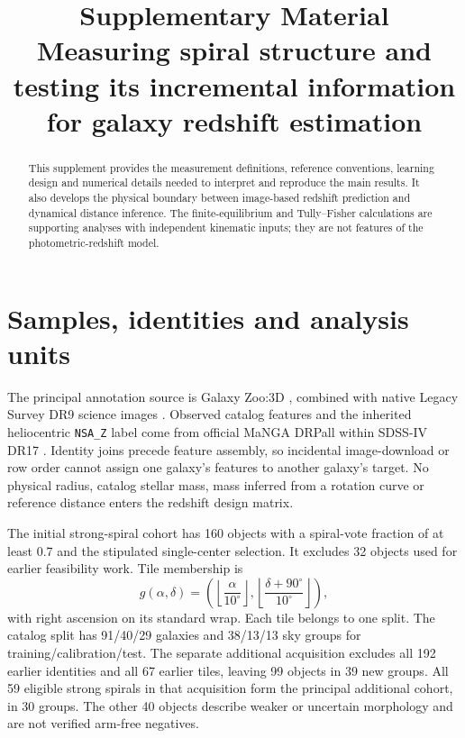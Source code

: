 \documentclass[10pt]{article}
\title{Supplementary Material\\Measuring spiral structure and testing its incremental information for galaxy redshift estimation}
\author{\PaperAuthors\PaperAffiliation}
\date{}
\begin{document}
\maketitle
\begin{abstract}
This supplement provides the measurement definitions, reference conventions,
learning design and numerical details needed to interpret and reproduce the
main results. It also develops the physical boundary between image-based
redshift prediction and dynamical distance inference. The finite-equilibrium
and Tully--Fisher calculations are supporting analyses with independent
kinematic inputs; they are not features of the photometric-redshift model.
\end{abstract}
\tableofcontents

\section{Samples, identities and analysis units}
The principal annotation source is Galaxy Zoo:3D \citep{masters2021}, combined
with native Legacy Survey DR9 science images \citep{dey2019}. Observed catalog
features and the inherited heliocentric \texttt{NSA\_Z} label come from official
MaNGA DRPall within SDSS-IV DR17 \citep{york2000,bundy2015,dr172022}.
Identity joins precede feature assembly, so incidental image-download or row
order cannot assign one galaxy's features to another galaxy's target.
No physical radius, catalog stellar mass, mass inferred from a rotation curve
or reference distance enters the redshift design matrix.

The initial strong-spiral cohort has 160 objects with a spiral-vote fraction
of at least 0.7 and the stipulated single-center selection. It excludes 32
objects used for earlier feasibility work. Tile membership is
\begin{equation}
 g(\alpha,\delta)=\left(\left\lfloor\frac{\alpha}{10^{\circ}}\right\rfloor,
 \left\lfloor\frac{\delta+90^{\circ}}{10^{\circ}}\right\rfloor\right),
\end{equation}
with right ascension on its standard wrap. Each tile belongs to one split.
The catalog split has 91/40/29 galaxies and 38/13/13 sky groups for
training/calibration/test. The separate additional acquisition excludes all
192 earlier identities and all 67 earlier tiles, leaving 99 objects in 39
new groups. All 59 eligible strong spirals in that acquisition form the
principal additional cohort, in 30 groups. The other 40 objects describe
weaker or uncertain morphology and are not verified arm-free negatives.
\end{document}
